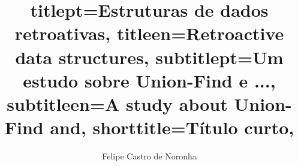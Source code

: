 

\title{
    titlept={Estruturas de dados retroativas},
    titleen={Retroactive data structures},
    subtitlept={Um estudo sobre Union-Find e ...},
    subtitleen={A study about Union-Find and},
    shorttitle={Título curto},
}

\author[mas]{Felipe Castro de Noronha}



